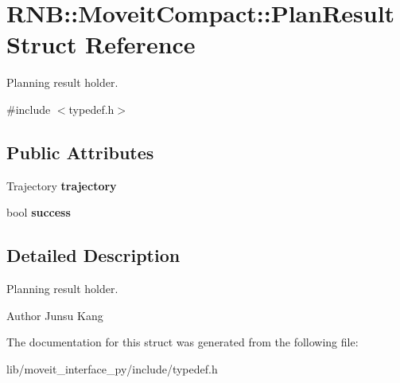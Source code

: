 \hypertarget{struct_r_n_b_1_1_moveit_compact_1_1_plan_result}{}\section{R\+NB\+:\+:Moveit\+Compact\+:\+:Plan\+Result Struct Reference}
\label{struct_r_n_b_1_1_moveit_compact_1_1_plan_result}


Planning result holder.  




{\ttfamily \#include $<$typedef.\+h$>$}

\subsection*{Public Attributes}
\begin{DoxyCompactItemize}
\item 
\mbox{\label{struct_r_n_b_1_1_moveit_compact_1_1_plan_result_a08a7c810afe0f52d919872b7e912826d}} 
Trajectory {\bfseries trajectory}
\item 
\mbox{\label{struct_r_n_b_1_1_moveit_compact_1_1_plan_result_aea46d4251ebb6d54150bb5a98f75fb73}} 
bool {\bfseries success}
\end{DoxyCompactItemize}


\subsection{Detailed Description}
Planning result holder. 

\begin{DoxyAuthor}{Author}
Junsu Kang 
\end{DoxyAuthor}


The documentation for this struct was generated from the following file\+:\begin{DoxyCompactItemize}
\item 
lib/moveit\+\_\+interface\+\_\+py/include/typedef.\+h\end{DoxyCompactItemize}

